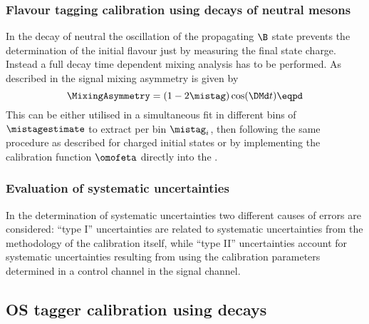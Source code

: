 \subsubsection[Flavour tagging calibration using decays of neutral \Bmesons]{Flavour tagging calibration using decays of neutral \Bbfsf mesons}
\label{sec:flavour_tagging:calibration:method:neutral}

In the decay of neutral \Bmesons the oscillation of the propagating $\B$ state
prevents the determination of the initial flavour just by measuring the final
state charge. Instead a full decay time dependent mixing analysis has to be
performed. As described \eg in \cite{Aaij:2012nt} the signal mixing asymmetry is
given by
%
\begin{equation}
  \MixingAsymmetry = (1 - 2\mistag)\cos(\DMd t)\eqpd
\end{equation}
%
This can be either utilised in a simultaneous fit in different bins of
$\mistagestimate$ to extract per bin $\mistag_i$, then following the same
procedure as described for charged initial states or by implementing the
calibration function $\omofeta$ directly into the \PDF.

\subsubsection{Evaluation of systematic uncertainties}
\label{sec:flavour_tagging:calibration:method:systematics}

In the determination of systematic uncertainties two different causes of errors
are considered: \enquote{type I} uncertainties are related to systematic
uncertainties from the methodology of the calibration itself, while
\enquote{type II} uncertainties account for systematic uncertainties resulting
from using the calibration parameters determined in a control channel in the
signal channel.

\subsection[
  head={\ac{OS} tagger calibration using \BuToJpsiK decays},
  tocentry={\ac{OS} tagger calibration using \BuToJpsiKHyperref decays}
]{\ac{OS} tagger calibration using \BuToJpsiKbfsf decays}
\label{sec:flavour_tagging:calibration:os}

